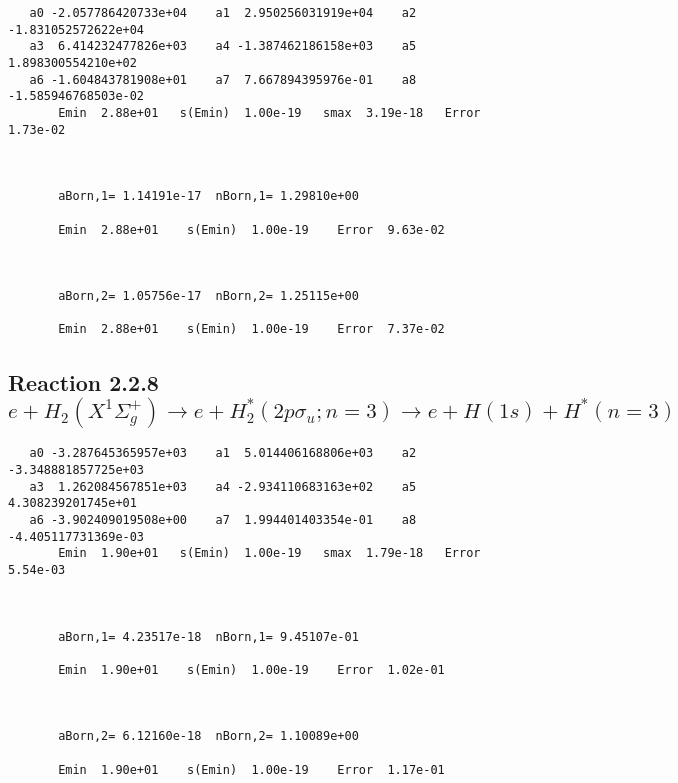 \documentclass[12pt]{article}
\begin{document}
\begin{small}\begin{verbatim}
   a0 -2.057786420733e+04    a1  2.950256031919e+04    a2 -1.831052572622e+04
   a3  6.414232477826e+03    a4 -1.387462186158e+03    a5  1.898300554210e+02
   a6 -1.604843781908e+01    a7  7.667894395976e-01    a8 -1.585946768503e-02
       Emin  2.88e+01   s(Emin)  1.00e-19   smax  3.19e-18   Error  1.73e-02



       aBorn,1= 1.14191e-17  nBorn,1= 1.29810e+00

       Emin  2.88e+01    s(Emin)  1.00e-19    Error  9.63e-02



       aBorn,2= 1.05756e-17  nBorn,2= 1.25115e+00

       Emin  2.88e+01    s(Emin)  1.00e-19    Error  7.37e-02
\end{verbatim}\end{small}




\newpage
\subsection{
Reaction 2.2.8 $e + H_2(X^1\Sigma_g^+) \rightarrow e + H_2^*(2p\sigma_u;n=3) \rightarrow e + H(1s) + H^*(n=3)$}
















\begin{small}\begin{verbatim}
   a0 -3.287645365957e+03    a1  5.014406168806e+03    a2 -3.348881857725e+03
   a3  1.262084567851e+03    a4 -2.934110683163e+02    a5  4.308239201745e+01
   a6 -3.902409019508e+00    a7  1.994401403354e-01    a8 -4.405117731369e-03
       Emin  1.90e+01   s(Emin)  1.00e-19   smax  1.79e-18   Error  5.54e-03



       aBorn,1= 4.23517e-18  nBorn,1= 9.45107e-01

       Emin  1.90e+01    s(Emin)  1.00e-19    Error  1.02e-01



       aBorn,2= 6.12160e-18  nBorn,2= 1.10089e+00

       Emin  1.90e+01    s(Emin)  1.00e-19    Error  1.17e-01
\end{verbatim}\end{small}
\end{document}
